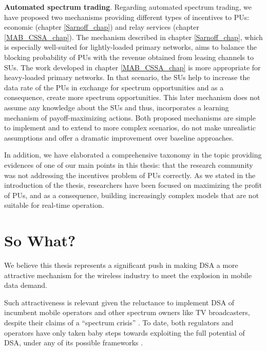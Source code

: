 \textbf{Automated spectrum trading}. Regarding automated spectrum trading, we have proposed two mechanisms providing different types of incentives to PUs: economic (chapter \ref{Sarnoff_chap}) and relay services (chapter \ref{MAB_CSSA_chap}). The mechanism described in chapter \ref{Sarnoff_chap}, which is especially well-suited for lightly-loaded primary networks, aims to balance the blocking probability of PUs with the revenue obtained from leasing channels to SUs. The work developed in chapter \ref{MAB_CSSA_chap} is more appropriate for heavy-loaded primary networks. In that scenario, the SUs help to increase the data rate of the PUs in exchange for spectrum opportunities and as a consequence, create more spectrum opportunities. This later mechanism does not assume any knowledge about the SUs and thus, incorporates a learning mechanism of payoff-maximizing actions. Both proposed mechanisms are simple to implement and to extend to more complex scenarios, do not make unrealistic assumptions and offer a dramatic improvement over baseline approaches. %

In addition, we have elaborated a comprehensive taxonomy in the topic providing evidences of one of our main points in this thesis: that the research community was not addressing the incentives problem of PUs correctly. As we stated in the introduction of the thesis, researchers have been focused on maximizing the profit of PUs, and as a consequence, building increasingly complex models that are not suitable for real-time operation.

\section{So What?} %
We believe this thesis represents a significant push in making DSA a more attractive mechanism for the wireless industry to meet the explosion in mobile data demand. 

Such attractiveness is relevant given the reluctance to implement DSA of incumbent mobile operators and other spectrum owners like TV broadcasters, despite their claims of a \enquote{spectrum crisis} \cite{Chen2012b}. To date, both regulators and operators have only taken baby steps towards exploiting the full potential of DSA, under any of its possible frameworks \cite{Nuechterlein2013, ref:Kelly2012}.

